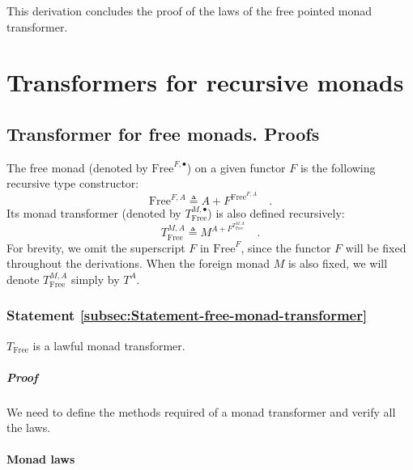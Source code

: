 This derivation concludes the proof of the laws of the free pointed
monad transformer.

\section{Transformers for recursive monads}

\subsection{Transformer for free monads. Proofs}

The free monad (denoted by $\text{Free}^{F,\bullet}$) on a given
functor $F$ is the following recursive type constructor:
\[
\text{Free}^{F,A}\triangleq A+F^{\text{Free}^{F,A}}\quad.
\]
Its monad transformer (denoted by $T_{\text{Free}}^{M,\bullet}$)
is also defined recursively:
\[
T_{\text{Free}}^{M,A}\triangleq M^{A+F^{T_{\text{Free}}^{M,A}}}\quad.
\]
For brevity, we omit the superscript $F$ in $\text{Free}^{F}$, since
the functor $F$ will be fixed throughout the derivations. When the
foreign monad $M$ is also fixed, we will denote $T_{\text{Free}}^{M,A}$
simply by $T^{A}$.

\subsubsection{Statement \label{subsec:Statement-free-monad-transformer}\ref{subsec:Statement-free-monad-transformer}}

$T_{\text{Free}}$ is a lawful monad transformer.

\subparagraph{Proof}

We need to define the methods required of a monad transformer and
verify all the laws. 

\paragraph{Monad laws}

